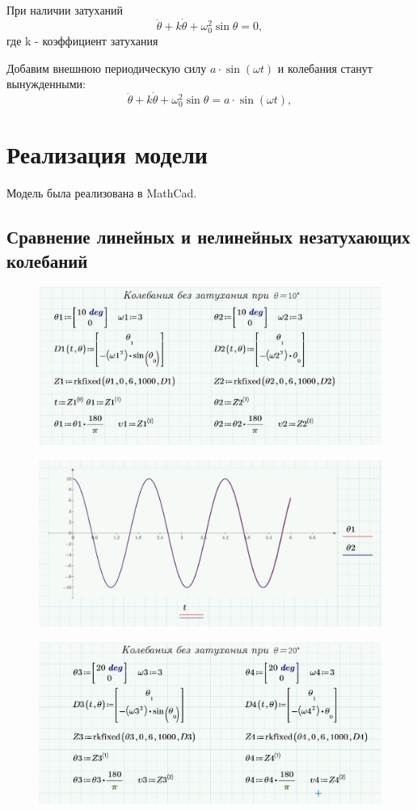 \documentclass[a4paper, 14pt]{extarticle}
\begin{document}
		При наличии затуханий
		\[ \ddot{\theta} + k \dot{\theta} + \omega_0^2\sin{\theta} = 0, \]
		где k - коэффициент затухания
		
		Добавим внешнюю периодическую силу $a \cdot \sin{(\omega t)}$ и колебания станут вынужденными:
		\[ \ddot{\theta} + k \dot{\theta} + \omega_0^2\sin{\theta} = a \cdot \sin{(\omega t)}, \]
	
	\pagebreak
	\section{Реализация модели}
		Модель была реализована в MathCad.
		\subsection{Сравнение линейных и нелинейных незатухающих колебаний}		
		\begin{figure}[H]
			\centering
			\includegraphics[width = \linewidth]{1.jpg}
		\end{figure}
		\begin{figure}[H]
			\centering
			\includegraphics[width = \linewidth]{2.jpg}
		\end{figure}
		\begin{figure}[H]
			\centering
			\includegraphics[width = \linewidth]{3.jpg}
		\end{figure}
\end{document}
